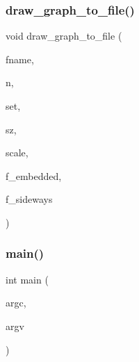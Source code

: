 \subsubsection{\texorpdfstring{draw\+\_\+graph\+\_\+to\+\_\+file()}{draw\_graph\_to\_file()}}
{\footnotesize\ttfamily void draw\+\_\+graph\+\_\+to\+\_\+file (\begin{DoxyParamCaption}\item[{const \mbox{\hyperlink{galois_8h_ab6cc7b4aeb6ea31aba2b3fbfc83ff5e6}{B\+Y\+TE}} $\ast$}]{fname,  }\item[{\mbox{\hyperlink{galois_8h_a09fddde158a3a20bd2dcadb609de11dc}{I\+NT}}}]{n,  }\item[{\mbox{\hyperlink{galois_8h_a09fddde158a3a20bd2dcadb609de11dc}{I\+NT}} $\ast$}]{set,  }\item[{\mbox{\hyperlink{galois_8h_a09fddde158a3a20bd2dcadb609de11dc}{I\+NT}}}]{sz,  }\item[{double}]{scale,  }\item[{\mbox{\hyperlink{galois_8h_a09fddde158a3a20bd2dcadb609de11dc}{I\+NT}}}]{f\+\_\+embedded,  }\item[{\mbox{\hyperlink{galois_8h_a09fddde158a3a20bd2dcadb609de11dc}{I\+NT}}}]{f\+\_\+sideways }\end{DoxyParamCaption})}

\mbox{\label{_a_p_p_s_2_c_o_m_b_i_n_a_t_o_r_i_c_s_2nauty_8_c_a3c04138a5bfe5d72780bb7e82a18e627}} 
\subsubsection{\texorpdfstring{main()}{main()}}
{\footnotesize\ttfamily int main (\begin{DoxyParamCaption}\item[{int}]{argc,  }\item[{char $\ast$$\ast$}]{argv }\end{DoxyParamCaption})}

\mbox{\label{_a_p_p_s_2_c_o_m_b_i_n_a_t_o_r_i_c_s_2nauty_8_c_a1af24683536770c91869ef9785e99c68}} 
